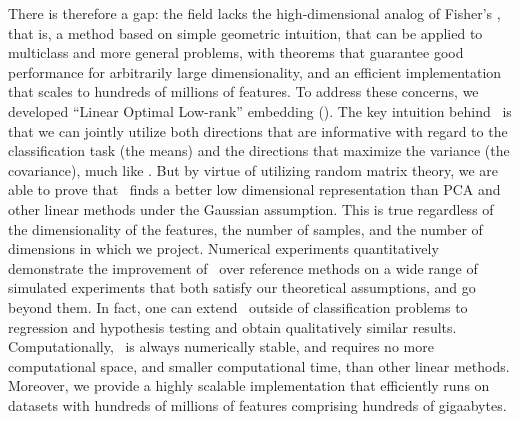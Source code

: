 \documentclass[10pt]{article}
\begin{document}
There is therefore a gap: the field lacks the high-dimensional analog of Fisher's \Lda, that is, a method based on simple geometric intuition, that can be applied to multiclass and more general problems, with theorems that guarantee good performance for arbitrarily large dimensionality, and an efficient implementation that scales to hundreds of millions of features. 
%
%
To address these concerns,  we developed ``Linear Optimal Low-rank'' embedding (\Lol). The key intuition behind \Lol~is that we can jointly utilize both  directions that are informative with regard to the classification task (the means) and the directions that maximize the variance (the covariance), much like \Lda.  But by virtue of utilizing random matrix theory, we are able to prove that \Lol~finds a better low dimensional representation than PCA and other linear methods under the Gaussian assumption. This is true regardless of the dimensionality of the features, the number of samples, and the number of dimensions in which we project.  
%
Numerical experiments quantitatively demonstrate the improvement of \Lol~over reference methods on a wide range of simulated experiments that both satisfy our theoretical assumptions, and go beyond them. 
%
In fact, one can extend \Lol~outside of classification problems to  regression and hypothesis testing and obtain qualitatively similar results.  Computationally, \Lol~is always numerically stable, and requires no more computational space, and smaller computational time, than other linear methods.  Moreover, we provide a highly scalable implementation that efficiently runs on datasets with hundreds of millions of features comprising hundreds of gigaabytes.
\end{document}
